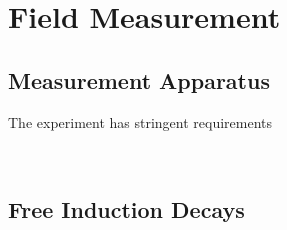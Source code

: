 \chapter{Field Measurement}

\section{Measurement Apparatus}

The \gmtwo experiment has stringent requirements 


\
\section{Free Induction Decays}

